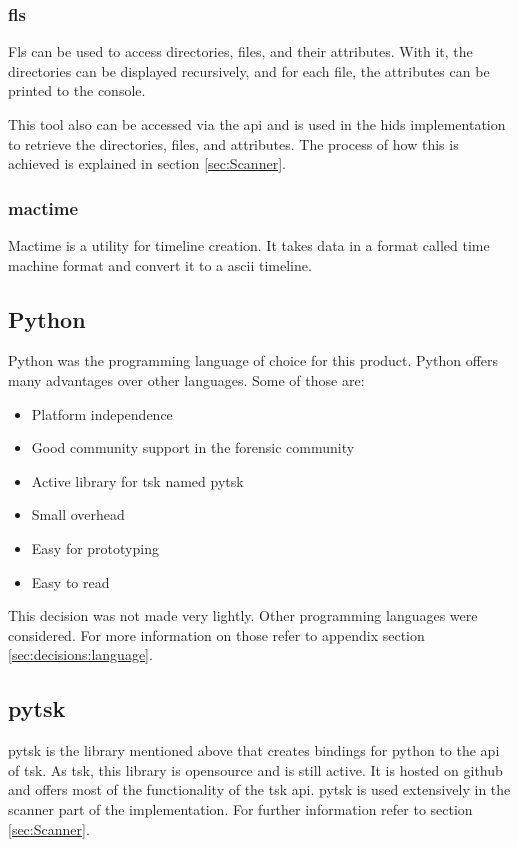 \subsubsection{fls}
\label{sec:fls}

Fls can be used to access directories, files, and their attributes. With it, the directories can be displayed recursively, and for each file, the attributes can be printed to the console. \cite{tsk:fls} 

This tool also can be accessed via the \gls{api} and is used in the \gls{hids} implementation to retrieve the directories, files, and attributes. The process of how this is achieved is explained in section \ref{sec:Scanner}.

\subsubsection{mactime}
\label{sec:mactime}

Mactime is a utility for timeline creation. It takes data in a format called time machine format and convert it to a ascii timeline. \cite{tsk:mactime, tsk:bodyfile}

\subsection{Python}
\label{sec:python}

Python was the programming language of choice for this product. Python offers many advantages over other languages. Some of those are:

\begin{itemize}
    \item Platform independence
    \item Good community support in the forensic community
    \item Active library for \gls{tsk} named \gls{pytsk}
    \item Small overhead
    \item Easy for prototyping
    \item Easy to read
\end{itemize}

This decision was not made very lightly. Other programming languages were considered. For more information on those refer to appendix section \ref{sec:decisions:language}.

\subsection{pytsk}
\label{sec:pytsk3}

\Gls{pytsk} is the library mentioned above that creates bindings for python to the \gls{api} of \gls{tsk}. As \gls{tsk}, this library is \gls{opensource} and is still active. It is hosted on \gls{github} and offers most of the functionality of the \gls{tsk} \gls{api}. \Gls{pytsk} is used extensively in the scanner part of the implementation. For further information refer to section \ref{sec:Scanner}.

